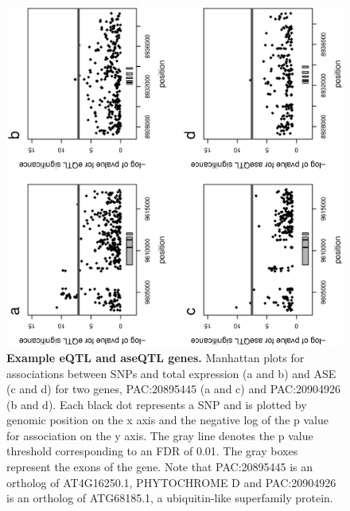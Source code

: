 \begin{figure}[ht]
      \centering
       \includegraphics[width=\linewidth]{Ch3FigS3}
    \caption{\textbf{Example eQTL and aseQTL genes.} Manhattan plots for associations between SNPs and total expression (a and b) and ASE (c and d) for two genes, PAC:20895445 (a and c) and PAC:20904926 (b and d). Each black dot represents a SNP and is plotted by genomic position on the x axis and the negative log of the p value for association on the y axis. The gray line denotes the p value threshold corresponding to an FDR of 0.01. The gray boxes represent the exons of the gene. Note that PAC:20895445 is an ortholog of AT4G16250.1, PHYTOCHROME D and PAC:20904926 is an ortholog of ATG68185.1, a ubiquitin-like superfamily protein.}
    \label{fig:3figS3}
\end{figure}

